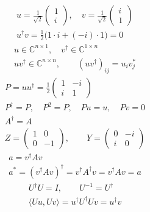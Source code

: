 \documentclass{article}
\begin{document}
\newpage
\null\vfill\[\begin{gathered}
u=\frac1{\sqrt2}\begin{pmatrix}1\\ i\end{pmatrix},\quad v=\frac1{\sqrt2}\begin{pmatrix}i\\1\end{pmatrix}\\[12pt]u^\dagger v=\frac12\bigl(1\cdot i+(-i)\cdot1\bigr)=0
\end{gathered}\]\vfill\null
\newpage
\null\vfill\[\begin{gathered}
u\in\mathbb C^{n\times1},\quad v^\dagger\in\mathbb C^{1\times n}\\[12pt]uv^\dagger\in\mathbb C^{n\times n},\qquad (uv^\dagger)_{ij}=u_i v_j^*
\end{gathered}\]\vfill\null
\newpage
\null\vfill\[\begin{gathered}
P=uu^\dagger=\frac12\begin{pmatrix}1&-i\\i&1\end{pmatrix}\\[12pt]P^\dagger=P,\quad P^2=P,\quad Pu=u,\quad Pv=0
\end{gathered}\]\vfill\null
\newpage
\null\vfill\[\begin{gathered}
A^\dagger=A\\[12pt]Z=\begin{pmatrix}1&0\\0&-1\end{pmatrix},\qquad Y=\begin{pmatrix}0&-i\\i&0\end{pmatrix}
\end{gathered}\]\vfill\null
\newpage
\null\vfill\[\begin{gathered}
a=v^\dagger Av\\[10pt]a^*=(v^\dagger Av)^\dagger=v^\dagger A^\dagger v=v^\dagger Av=a
\end{gathered}\]\vfill\null
\newpage
\null\vfill\[\begin{gathered}
U^\dagger U=I,\qquad U^{-1}=U^\dagger\\[12pt]\langle Uu,Uv\rangle=u^\dagger U^\dagger Uv=u^\dagger v
\end{gathered}\]\vfill\null
\end{document}
